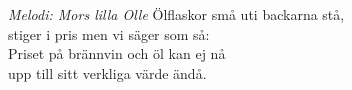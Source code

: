 {\footnotesize\textit{Melodi: Mors lilla Olle}}
\vspace{10pt}
Ölflaskor små uti backarna stå,\\
stiger i pris men vi säger som så:\\
Priset på brännvin och öl kan ej nå\\
upp till sitt verkliga värde ändå.
